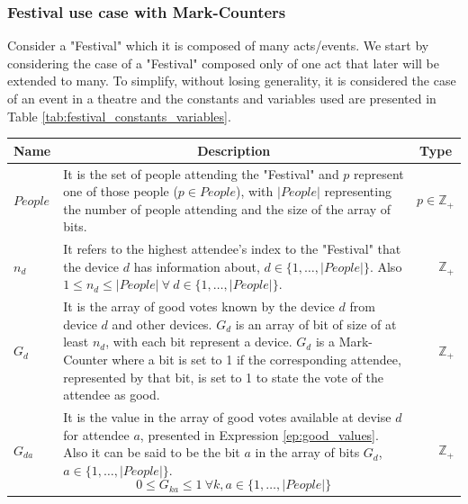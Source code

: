 \subsubsection{Festival use case with Mark-Counters} 
Consider a "Festival" which it is composed of many acts/events. We start by considering the case of a "Festival" composed only of one act that later will be extended to many. To simplify, without losing generality, it is considered the case of an event in a theatre and the constants and variables used are presented in Table \ref{tab:festival_constants_variables}.
\begin{table}[!ht]
	\begin{tabular}{|p{2.4cm}|p{13.2cm}|r| }
		\hline
		\multicolumn{1}{|c|}{Name} & \multicolumn{1}{c|}{Description} & \multicolumn{1}{c|}{Type} \\
		\hline
		\hline
			$People$ & It is the set of people attending the "Festival" and $p$ represent one of those people ($p \in People$), with $|People|$ representing the number of people attending and the size of the array of bits. & $p \in \mathbb{Z}_{+}$ \\
		\hline
			$n_{d}$ & It refers to the highest attendee's index to the "Festival" that the device $d$ has information about,  $d \in \{1,\dots, |People|\}$. Also $1 \le n_{d} \le |People| ~ \forall ~ d \in \{1,\dots, |People|\}$. & $\mathbb{Z}_{+}$ \\
		\hline
			$G_{d}$ & It is the array of good votes known by the device $d$ from device $d$ and other devices. $G_{d}$ is an array of bit of size of at least $n_{d}$, with each bit represent a device. $G_{d}$ is a Mark-Counter where a bit is set to 1 if the corresponding attendee, represented by that bit, is set to 1 to state the vote of the attendee as good. & $\mathbb{Z}_{+}$ \\
		\hline 
			$G_{da}$ & It is the value in the array of good votes available at devise $d$ for attendee $a$, presented in Expression \ref{ep:good_values}. Also it can be said to be the bit $a$ in the array of bits $G_{d}$, $a \in \{1,\dots, |People|\}$.
				\begin{equation} \label{ep:good_values}
					0 \le G_{ka} \le 1 ~ \forall k,a \in \{1,\dots, |People|\}
				\end{equation} & 
			$\mathbb{Z}_{+}$ \\

\end{tabular}
\end{table}
